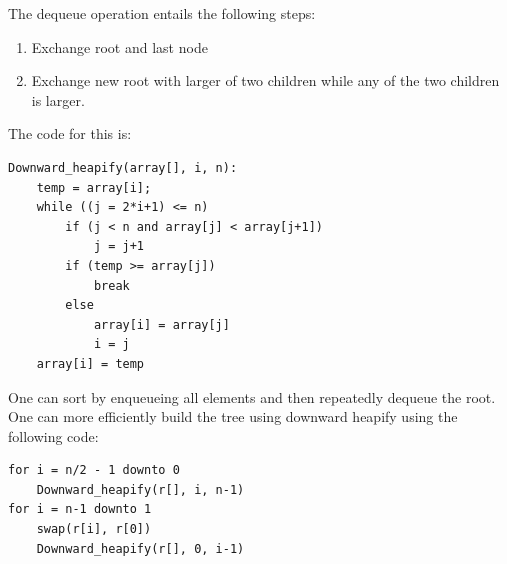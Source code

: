 \documentclass[nobib]{tufte-handout}
\begin{document}
The dequeue operation entails the following steps:
\begin{enumerate}
    \item Exchange root and last node
    \item Exchange new root with larger of two children while any of the two children is larger.
\end{enumerate}
The code for this is:
\begin{lstlisting}
Downward_heapify(array[], i, n):
    temp = array[i];
    while ((j = 2*i+1) <= n)
        if (j < n and array[j] < array[j+1])
            j = j+1
        if (temp >= array[j])
            break
        else
            array[i] = array[j]
            i = j
    array[i] = temp
\end{lstlisting}
One can sort by enqueueing all elements and then repeatedly dequeue the root.\\
One can more efficiently build the tree using downward heapify using the following code:
\begin{lstlisting}
for i = n/2 - 1 downto 0
    Downward_heapify(r[], i, n-1)
for i = n-1 downto 1
    swap(r[i], r[0])
    Downward_heapify(r[], 0, i-1)
\end{lstlisting}
\end{document}
